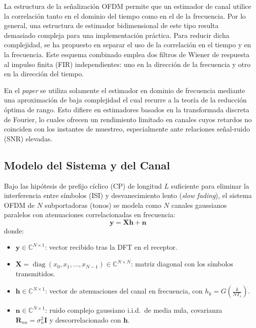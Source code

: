 \documentclass[a4paper]{article}
\begin{document}
La estructura de la señalización OFDM permite que un estimador de canal utilice la correlación tanto en el dominio del tiempo como en el de la frecuencia. Por lo general, una estructura de estimador bidimensional de este tipo resulta demasiado compleja para una implementación práctica. Para reducir dicha complejidad, se ha propuesto en \cite{bahai2002} separar el uso de la correlación en el tiempo y en la frecuencia. Este esquema combinado emplea dos filtros de Wiener de respuesta al impulso finita (FIR) independientes: uno en la dirección de la frecuencia y otro en la dirección del tiempo.


En el \textit{paper} \cite{edfors1996} se utiliza solamente el estimador en dominio de frecuencia mediante una aproximación de baja complejidad el cual recurre a la teoría de la reducción óptima de rango. Esto difiere en estimadores basados en la transformada discreta de Fourier, lo cuales ofrecen un rendimiento limitado en canales cuyos retardos no coinciden con los instantes de muestreo, especialmente ante relaciones señal-ruido (SNR) elevadas.

\subsection*{Modelo del Sistema y del Canal}

Bajo las hipótesis de prefijo cíclico (CP) de longitud $L$ suficiente para eliminar la interferencia entre símbolos (ISI) y desvanecimiento lento (\textit{slow fading}), el sistema OFDM de $N$ subportadoras (tonos) se modela como $N$ canales gaussianos paralelos con atenuaciones correlacionadas en frecuencia:
\begin{equation}
    \mathbf{y} = \mathbf{X}\mathbf{h} + \mathbf{n}
    \label{eq:modelo_sistema}
\end{equation}
donde:
\begin{itemize}
    \item $\mathbf{y} \in \mathbb{C}^{N \times 1}$: vector recibido tras la DFT en el receptor.
    \item $\mathbf{X} = \operatorname{diag}(x_0, x_1, \dots, x_{N-1}) \in \mathbb{C}^{N \times N}$: matriz diagonal con los símbolos transmitidos.
    \item $\mathbf{h} \in \mathbb{C}^{N \times 1}$: vector de atenuaciones del canal en frecuencia, con $h_k = G\left(\frac{k}{N T_s}\right)$.
    \item $\mathbf{n} \in \mathbb{C}^{N \times 1}$: ruido complejo gaussiano i.i.d.\ de media nula, covarianza $\mathbf{R}_{nn} = \sigma_n^2 \mathbf{I}$ y descorrelacionado con $\mathbf{h}$.
\end{itemize}
\end{document}
